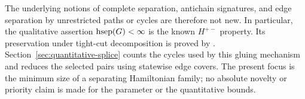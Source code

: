 The underlying notions of complete separation, antichain signatures, and edge
separation by unrestricted paths or cycles are therefore not new. In
particular, the qualitative assertion $\operatorname{hsep}(G)<\infty$ is the known
$H^{+-}$ property. Its preservation under tight-cut decomposition is proved
by \citet[Lemma 4.5(iv) and Theorem 1.7(iv)]{GorskySteinerWiederrecht2023}.
Section~\ref{sec:quantitative-splice} counts the cycles used by this gluing
mechanism and reduces the selected pairs using statewise edge covers.
The present focus is the minimum size of a separating Hamiltonian family;
no absolute novelty or priority claim is made for the parameter or the
quantitative bounds.
